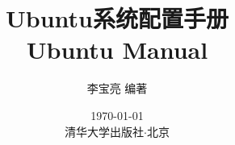 \title{\hei\vspace*{-2cm} Ubuntu系统配置手册\\{\vspace*{-1.2cm} Ubuntu Manual}}
\author{李宝亮 \hspace{1em}编著}
\date{\today\\清华大学出版社$\cdot$北京}
\maketitle

